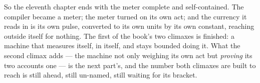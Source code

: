 So the eleventh chapter ends with the meter complete and self-contained. The compiler became a meter; the meter turned
on its own act; and the currency it reads in is its own pulse, converted to its own units by its own constant, reaching
outside itself for nothing. The first of the book's two climaxes is finished: a machine that measures itself, in
itself, and stays bounded doing it. What the second climax adds --- the machine not only weighing its own act but
\emph{proving} its two accounts one --- is the next part's, and the number both climaxes are built to reach is still
ahead, still un-named, still waiting for its bracket.

